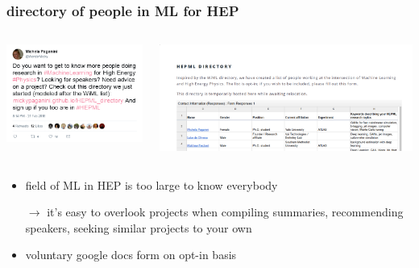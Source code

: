 \begin{frame}
  \frametitle{directory of people in ML for HEP}
	\begin{columns}
		\begin{column}{.3\textwidth}
			\includegraphics[width=.9\textwidth]{./tweet.png}
		\end{column}
		\begin{column}{.7\textwidth}
			\includegraphics[width=\textwidth]{./directory.png}
		\end{column}
	\end{columns}
    \begin{itemize}
      \item field of ML in HEP is too large to know everybody
      \item[$\rightarrow$] it's easy to overlook projects when compiling summaries, recommending speakers, seeking similar projects to your own
      \item voluntary google docs form on opt-in basis
    \end{itemize}

\end{frame}

